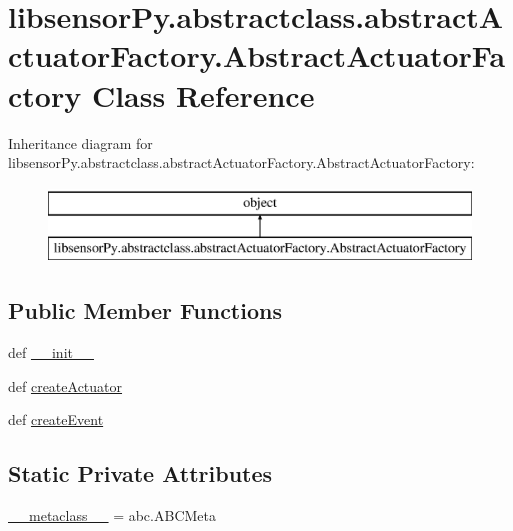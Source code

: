 \hypertarget{classlibsensorPy_1_1abstractclass_1_1abstractActuatorFactory_1_1AbstractActuatorFactory}{}\section{libsensor\+Py.\+abstractclass.\+abstract\+Actuator\+Factory.\+Abstract\+Actuator\+Factory Class Reference}
\label{classlibsensorPy_1_1abstractclass_1_1abstractActuatorFactory_1_1AbstractActuatorFactory}
Inheritance diagram for libsensor\+Py.\+abstractclass.\+abstract\+Actuator\+Factory.\+Abstract\+Actuator\+Factory\+:\begin{figure}[H]
\begin{center}
\leavevmode
\includegraphics[height=2.000000cm]{classlibsensorPy_1_1abstractclass_1_1abstractActuatorFactory_1_1AbstractActuatorFactory}
\end{center}
\end{figure}
\subsection*{Public Member Functions}
\begin{DoxyCompactItemize}
\item 
def \hyperlink{classlibsensorPy_1_1abstractclass_1_1abstractActuatorFactory_1_1AbstractActuatorFactory_a0d27d56eeacb7f38c85c81bddc483a2d}{\+\_\+\+\_\+init\+\_\+\+\_\+}
\item 
def \hyperlink{classlibsensorPy_1_1abstractclass_1_1abstractActuatorFactory_1_1AbstractActuatorFactory_aa98084a611f51b5c459dd38ef5330b48}{create\+Actuator}
\item 
def \hyperlink{classlibsensorPy_1_1abstractclass_1_1abstractActuatorFactory_1_1AbstractActuatorFactory_aae86303be12230b956824654fbcbbc8e}{create\+Event}
\end{DoxyCompactItemize}
\subsection*{Static Private Attributes}
\begin{DoxyCompactItemize}
\item 
\hyperlink{classlibsensorPy_1_1abstractclass_1_1abstractActuatorFactory_1_1AbstractActuatorFactory_a38afed7ed9068df3a37174cb85e96929}{\+\_\+\+\_\+metaclass\+\_\+\+\_\+} = abc.\+A\+B\+C\+Meta
\end{DoxyCompactItemize}


